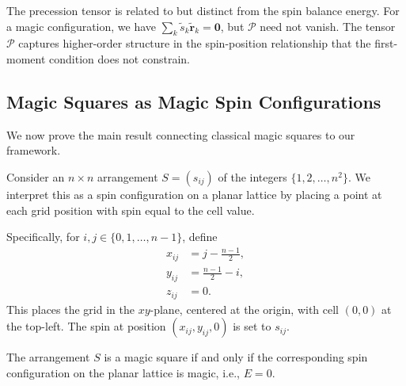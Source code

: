 The precession tensor is related to but distinct from the spin balance energy. For a magic configuration, we have $\sum_k \tilde{s}_k \tilde{\mathbf{r}}_k = \mathbf{0}$, but $\mathcal{P}$ need not vanish. The tensor $\mathcal{P}$ captures higher-order structure in the spin-position relationship that the first-moment condition does not constrain.

\subsection{Magic Squares as Magic Spin Configurations}
\label{sec:connection}

We now prove the main result connecting classical magic squares to our framework.

Consider an $n \times n$ arrangement $S = (s_{ij})$ of the integers $\{1, 2, \ldots, n^2\}$. We interpret this as a spin configuration on a planar lattice by placing a point at each grid position with spin equal to the cell value.

Specifically, for $i, j \in \{0, 1, \ldots, n-1\}$, define
\begin{align}
x_{ij} &= j - \frac{n-1}{2}, \\
y_{ij} &= \frac{n-1}{2} - i, \\
z_{ij} &= 0.
\end{align}
This places the grid in the $xy$-plane, centered at the origin, with cell $(0,0)$ at the top-left. The spin at position $(x_{ij}, y_{ij}, 0)$ is set to $s_{ij}$.

\begin{theorem}
\label{thm:connection}
The arrangement $S$ is a magic square if and only if the corresponding spin configuration on the planar lattice is magic, i.e., $E = 0$.
\end{theorem}

